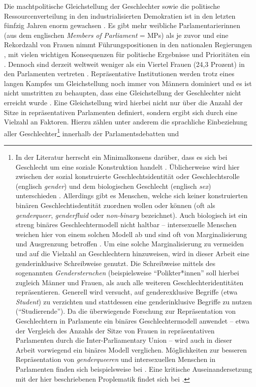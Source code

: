 \documentclass[12pt, 
    twoside=false, 
    bibliography=totoc, 
    numbers=endperiod, 
    headings=normal, 
    toc=chapterentrydotfill
    ]{scrbook}
\begin{document}
\noindent
Die machtpolitische Gleichstellung der Geschlechter sowie die politische Ressourcenverteilung in den industrialisierten Demokratien ist in den letzten fünfzig Jahren enorm gewachsen \parencite[318]{coffe_2010}. Es gibt mehr weibliche Parlamentarierinnen (aus dem englischen \emph{Members of Parliament} = MPs) als je zuvor und eine Rekordzahl von Frauen nimmt Führungspositionen in den nationalen Regierungen \parencites{lovenduski_2005}{paxton_2007}, mit vielen wichtigen Konsequenzen für politische Ergebnisse und Prioritäten ein \parencites{bolzendahl_2007}{carroll_2001}{waring_2000}[318]{coffe_2010}. Dennoch sind derzeit weltweit weniger als ein Viertel Frauen (24,3 Prozent) in den Parlamenten vertreten \parencite{ipu_2019}. Repräsentative Institutionen werden trotz eines langen Kampfes um Gleichstellung noch immer von Männern dominiert \parencites[149]{celis_2018}[497 f.]{childs_2013}{dahlerup_2013} {bjarnegard_2013} und es ist nicht umstritten zu behaupten, dass eine Gleichstellung der Geschlechter nicht erreicht wurde \parencite[150]{celis_2018}. Eine Gleichstellung wird hierbei nicht nur über die Anzahl der Sitze in repräsentativen Parlamenten definiert, sondern ergibt sich durch eine Vielzahl an Faktoren. Hierzu zählen unter anderem die sprachliche Einbeziehung aller Geschlechter\footnote{In der Literatur herrscht ein Minimalkonsens darüber, dass es sich bei Geschlecht um eine soziale Konstruktion handelt \parencite[2]{meissner_2008}. Üblicherweise wird hier zwischen der sozial konstruierte Geschlechtsidentität oder Geschlechtsrolle (englisch \emph{gender}) und dem biologischen Geschlecht (englisch \emph{sex}) unterschieden \parencite[3f.]{meissner_2008}. Allerdings gibt es Menschen, welche sich keiner konstruierten binären Geschlechtisdentität zuordnen wollen oder können (oft als \emph{genderqueer}, \emph{genderfluid} oder \emph{non-binary} bezeichnet). Auch biologisch ist ein streng binäres Geschlechtermodell nicht haltbar -- intersexuelle Menschen weichen hier von einem solchen Modell ab und sind oft von Marginalisierung und Ausgrenzung betroffen \parencite[vgl.][]{richards_2016}. Um eine solche Marginalisierung zu vermeiden und auf die Vielzahl an Geschlechtern hinzuweisen, wird in dieser Arbeit eine genderinklusive Schreibweise genutzt. Die Schreibweise mittels des sogenannten \emph{Gendersternchen} (beispielsweise \enquote{Polikter*innen} soll hierbei zugleich Männer und Frauen, als auch alle weiteren Geschlechteridentitäten repräsentieren. Generell wird versucht, auf genderexklusive Begriffe (etwa \emph{Student}) zu verzichten und stattdessen eine genderinklusive Begriffe zu nutzen (\enquote{Studierende}). Da die überwiegende Forschung zur Repräsentation von Geschlechtern in Parlamente ein binäres Geschlechtermodell anwendet -- etwa der Vergleich des Anzahls der Sitze von Frauen in repräsentativen Parlamenten durch die Inter-Parliamentary Union \textcite{ipu_2019} -- wird auch in dieser Arbeit vorwiegend ein binäres Modell verglichen. Möglichkeiten zur besseren Repräsentation von \emph{genderqueeren} und intersexuellen Menschen in Parlamenten finden sich beispielsweise bei \textcite{squires_2008}. Eine kritische Auseinandersetzung mit der hier beschriebenen Proplematik findet sich bei \parencite[6ff.]{meissner_2008}.} innerhalb der Parlamentsdebatten und 
\end{document}
